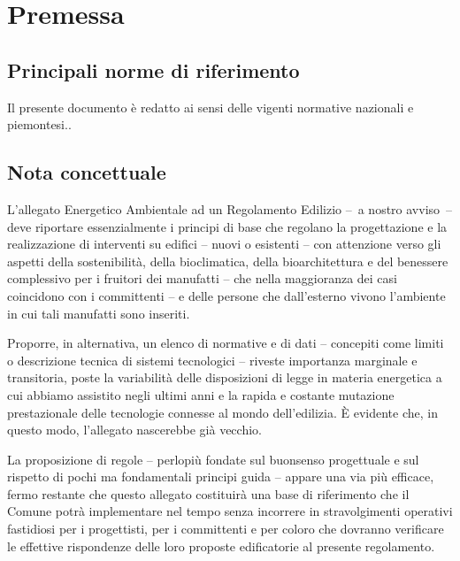 
\chapter{Premessa}
\label{chp:premessa}

\section{Principali norme di riferimento}
\label{sec:norme-riferimento-princ}

Il presente documento è redatto ai sensi delle vigenti normative nazionali e piemontesi..


\section{Nota concettuale}
\label{sec:nota-import}

L'allegato Energetico Ambientale ad un Regolamento Edilizio –~a nostro avviso~– deve riportare essenzialmente i principi di base che regolano la progettazione e la realizzazione di interventi su edifici – nuovi o esistenti – con attenzione verso gli aspetti della sostenibilità, della bioclimatica, della bioarchitettura e del benessere complessivo per i fruitori dei manufatti  – che nella maggioranza dei casi coincidono con i committenti – e delle persone che dall'esterno vivono l'ambiente in cui tali manufatti sono inseriti.

Proporre, in alternativa, un elenco di normative e di dati – concepiti come limiti o descrizione tecnica di sistemi tecnologici – riveste importanza marginale e transitoria, poste la variabilità delle disposizioni di legge in materia energetica a cui abbiamo assistito negli ultimi anni e la rapida e costante mutazione prestazionale delle tecnologie connesse al mondo dell'edilizia. È evidente che, in questo modo, l'allegato nascerebbe già vecchio. 

\noindent La proposizione di regole – perlopiù fondate sul buonsenso progettuale e sul rispetto di pochi ma fondamentali principi guida – appare una via più efficace,  fermo restante che questo allegato costituirà una base di riferimento che il Comune potrà implementare  nel tempo senza incorrere in stravolgimenti operativi fastidiosi per i progettisti, per i committenti e per coloro che dovranno verificare le effettive rispondenze delle loro proposte edificatorie al presente regolamento.




